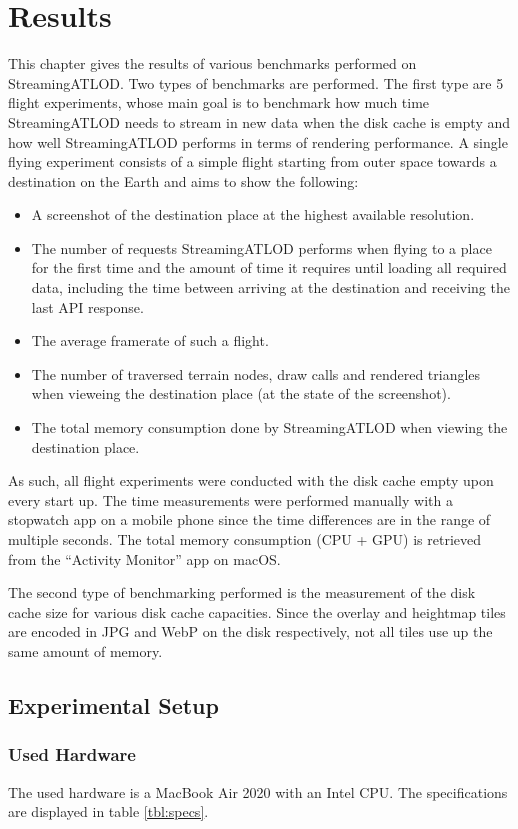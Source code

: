 \chapter{Results}
This chapter gives the results of various benchmarks performed on StreamingATLOD.
Two types of benchmarks are performed.
The first type are 5 flight experiments,
whose main goal is to benchmark how much time StreamingATLOD 
needs to stream in new data when the disk cache is empty
and how well StreamingATLOD performs in terms of rendering performance.
A single flying experiment consists of a simple 
flight starting from outer space towards a destination on the Earth and aims to show the following:
\begin{itemize}
  \item A screenshot of the destination place at the highest available resolution.
  \item The number of requests StreamingATLOD performs when flying to a place for the first time
  and the amount of time it requires until loading all required data, including the time 
  between arriving at the destination and receiving the last API response.
  \item The average framerate of such a flight.
  \item The number of traversed terrain nodes, draw calls and rendered triangles when vieweing the destination place (at the state of the screenshot).
  \item The total memory consumption done by StreamingATLOD when viewing the destination place.
\end{itemize}
As such, all flight experiments were conducted with the disk cache empty upon every start up.
The time measurements were performed manually with a stopwatch app on a mobile phone 
since the time differences are in the range of multiple seconds.
The total memory consumption (CPU + GPU) is retrieved 
from the ``Activity Monitor'' app on macOS.

The second type of benchmarking performed is the measurement 
of the disk cache size for various disk cache capacities.
Since the overlay and heightmap tiles are encoded in JPG and WebP on the disk respectively,
not all tiles use up the same amount of memory.

\section{Experimental Setup}
\subsection{Used Hardware}
The used hardware is a MacBook Air 2020 with an Intel CPU.
The specifications are displayed in table \ref{tbl:specs}.

